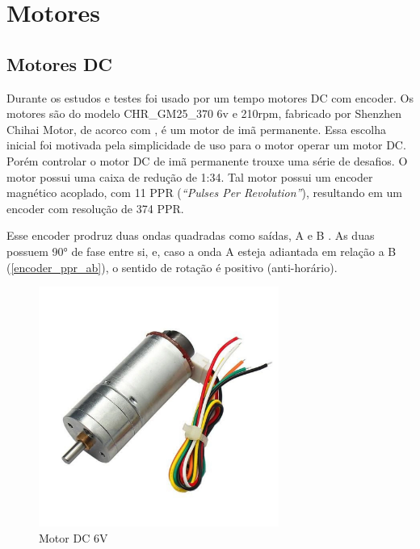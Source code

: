 
\section{Motores}  \label{secao_motores}

\subsection{Motores DC}

Durante os estudos e testes foi usado por um tempo motores DC com encoder.
Os motores são do modelo CHR\_GM25\_370 6v e 210rpm, fabricado por Shenzhen Chihai Motor,
de acorco com \cite{motor_dc_6v_encoder}, é um motor de imã permanente.
Essa escolha inicial foi motivada pela simplicidade de uso para o motor operar um motor DC.
Porém controlar o motor DC de imã permanente trouxe uma série de desafios.
O motor possui uma caixa de redução de 1:34. Tal motor possui um encoder magnético acoplado, com 11
PPR (\textit{``Pulses Per Revolution''}), resultando em um encoder com resolução de 374 PPR.

Esse encoder prodruz duas ondas quadradas como saídas, A e B \cite{encoder_ppr}.
As duas possuem 90° de fase entre si,
e, caso a onda A esteja adiantada em relação a B (\autoref{encoder_ppr_ab}),
o sentido de rotação é positivo (anti-horário).



\begin{figure}[ht]
	\centering
	\caption{Motor DC 6V}
	\includegraphics[width=0.7\textwidth]{figures/CHR_GM25_370}
\end{figure}

